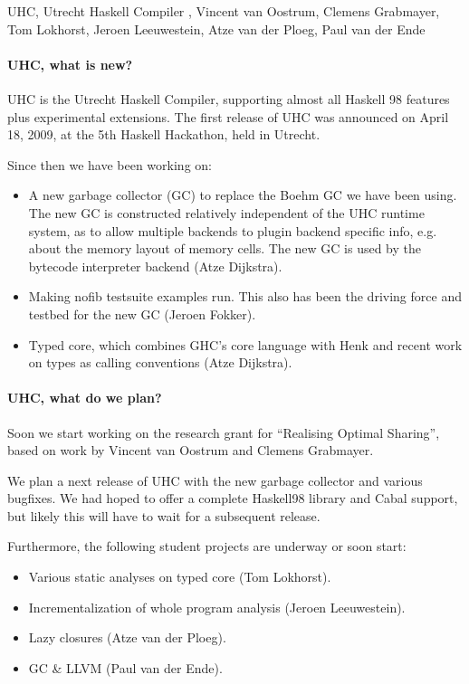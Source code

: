 \begin{hcarentry}[section]{UHC, Utrecht Haskell Compiler}
,
 Vincent van Oostrum, Clemens Grabmayer,
 Tom Lokhorst, Jeroen Leeuwestein, Atze van der Ploeg, Paul van der Ende
\label{uhc}
\label{ehc}
\makeheader

\paragraph{UHC, what is new?}
UHC is the Utrecht Haskell Compiler, supporting almost all Haskell 98 features plus
experimental extensions.
The first release of UHC was announced on April 18, 2009, at the 5th Haskell Hackathon, held in Utrecht.

Since then we have been working on:
\begin{itemize}
\item A new garbage collector (GC) to replace the Boehm GC we have been using. The new GC is constructed
relatively independent of the UHC runtime system, as to allow multiple backends to plugin backend specific info, e.g. about
the memory layout of memory cells.
The new GC is used by the bytecode interpreter backend
(Atze Dijkstra).
\item Making nofib testsuite examples run.
This also has been the driving force and testbed for the new GC
(Jeroen Fokker).
\item Typed core, which combines GHC's core language with Henk and recent work on types as calling conventions
(Atze Dijkstra).
\end{itemize}

\paragraph{UHC, what do we plan?}
Soon we start working on the research grant for ``Realising Optimal Sharing'', based on work by Vincent van Oostrum and Clemens Grabmayer.

We plan a next release of UHC with the new garbage collector and various bugfixes.
We had hoped to offer a complete Haskell98 library and Cabal support,
but likely this will have to wait for a subsequent release.

Furthermore, the following student projects are underway or soon start:

\begin{itemize}
\item Various static analyses on typed core (Tom Lokhorst).
\item Incrementalization of whole program analysis (Jeroen Leeuwestein).
\item Lazy closures (Atze van der Ploeg).
\item GC \& LLVM (Paul van der Ende).
\end{itemize}


\end{hcarentry}
